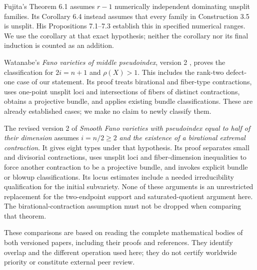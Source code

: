 \documentclass[11pt]{article}
\theoremstyle{definition}\newtheorem{definition}[theorem]{Definition}
\theoremstyle{remark}\newtheorem{remark}[theorem]{Remark}
\begin{document}
Fujita's Theorem 6.1 assumes $r-1$ numerically independent dominating
unsplit families. Its Corollary 6.4 instead assumes that every family in
Construction 3.5 is unsplit. His Propositions 7.1--7.3 establish this in
specified numerical ranges. We use the corollary at that exact hypothesis;
neither the corollary nor its final induction is counted as an addition.

Watanabe's \emph{Fano varieties of middle pseudoindex}, version 2
\cite{watanabe-middle}, proves the classification for $2i=n+1$ and
$\rho(X)>1$. This includes the rank-two defect-one case of our statement.
Its proof treats birational and fiber-type contractions, uses one-point
unsplit loci and intersections of fibers of distinct contractions, obtains
a projective bundle, and applies existing bundle classifications. These
are already established cases; we make no claim to newly classify them.

The revised version 2 of \emph{Smooth Fano varieties with pseudoindex equal
to half of their dimension} \cite{watanabe-half} assumes $i=n/2\ge2$
\emph{and the existence of a birational extremal contraction}. It gives
eight types under that hypothesis. Its proof separates small and divisorial
contractions, uses unsplit loci and fiber-dimension inequalities to force
another contraction to be a projective bundle, and invokes explicit bundle
or blowup classifications. Its locus estimates include a needed
irreducibility qualification for the initial subvariety. None of these
arguments is an unrestricted replacement for the two-endpoint support and
saturated-quotient argument here. The birational-contraction assumption
must not be dropped when comparing that theorem.

These comparisons are based on reading the complete mathematical bodies
of both versioned papers, including their proofs and references. They
identify overlap and the different operation used here; they do not
certify worldwide priority or constitute external peer review.
\end{document}
